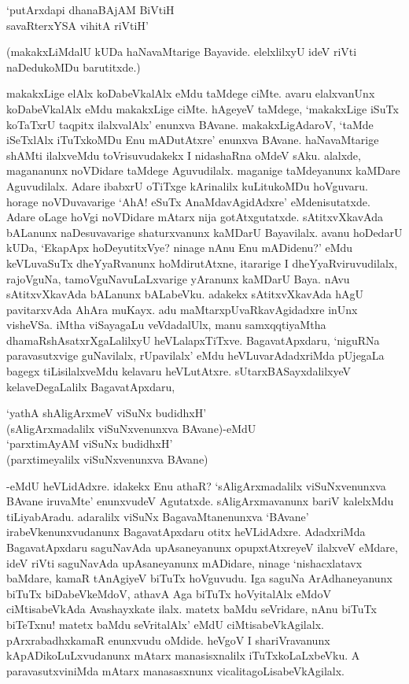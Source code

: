 \begin{shloka}
`putArxdapi dhanaBAjAM BiVtiH\\
savaRterxYSA vihitA riVtiH'
\end{shloka}

(makakxLiMdalU kUDa haNavaMtarige Bayavide. elelxlilxyU ideV riVti naDedukoMDu barutitxde.)

makakxLige elAlx koDabeVkalAlx eMdu taMdege ciMte. avaru elalxvanUnx koDabeVkalAlx eMdu makakxLige ciMte. hAgeyeV taMdege, `makakxLige iSuTx koTaTxrU taqpitx ilalxvalAlx' enunxva BAvane. makakxLigAdaroV, `taMde iSeTxlAlx iTuTxkoMDu Enu mADutAtxre' enunxva BAvane. haNavaMtarige shAMti ilalxveMdu toVrisuvudakekx I nidashaRna oMdeV sAku. alalxde, magananunx noVDidare taMdege Aguvudilalx. maganige taMdeyanunx kaMDare Aguvudilalx. Adare ibabxrU oTiTxge kArinalilx kuLitukoMDu hoVguvaru. horage noVDuvavarige `AhA! eSuTx AnaMdavAgidAdxre' eMdenisutatxde. Adare oLage hoVgi noVDidare mAtarx nija gotAtxgutatxde. sAtitxvXkavAda bALanunx naDesuvavarige shaturxvanunx kaMDarU Bayavilalx. avanu hoDedarU kUDa, `EkapApx hoDeyutitxVye? ninage nAnu Enu mADidenu?' eMdu keVLuvaSuTx dheYyaRvanunx hoMdirutAtxne, itararige I dheYyaRviruvudilalx, rajoVguNa, tamoVguNavuLaLxvarige yAranunx kaMDarU Baya. nAvu sAtitxvXkavAda bALanunx bALabeVku. adakekx sAtitxvXkavAda hAgU pavitarxvAda AhAra muKayx. adu maMtarxpUvaRkavAgidadxre inUnx visheVSa. iMtha viSayagaLu veVdadalUlx, manu samxqqtiyaMtha dhamaRshAsatxrXgaLalilxyU heVLalapxTiTxve. BagavatApxdaru, `niguRNa paravasutxvige guNavilalx, rUpavilalx' eMdu heVLuvarAdadxriMda pUjegaLa bagegx tiLisilalxveMdu kelavaru heVLutAtxre. sUtarxBASayxdalilxyeV kelaveDegaLalilx BagavatApxdaru,

\begin{shloka}
`yathA shAligArxmeV viSuNx budidhxH'\\
(sAligArxmadalilx viSuNxvenunxva BAvane)-eMdU\\
`parxtimAyAM viSuNx budidhxH'\\
(parxtimeyalilx viSuNxvenunxva BAvane)
\end{shloka}

-eMdU heVLidAdxre. idakekx Enu athaR? `sAligArxmadalilx viSuNxvenunxva BAvane iruvaMte' enunxvudeV Agutatxde. sAligArxmavanunx bariV kalelxMdu tiLiyabAradu. adaralilx viSuNx BagavaMtanenunxva `BAvane' irabeVkenunxvudanunx BagavatApxdaru otitx heVLidAdxre. AdadxriMda BagavatApxdaru saguNavAda upAsaneyanunx opupxtAtxreyeV ilalxveV eMdare, ideV riVti saguNavAda upAsaneyanunx mADidare, ninage `nishacxlatavx baMdare, kamaR tAnAgiyeV biTuTx hoVguvudu. Iga saguNa ArAdhaneyanunx biTuTx biDabeVkeMdoV, athavA Aga biTuTx hoVyitalAlx eMdoV ciMtisabeVkAda Avashayxkate ilalx. matetx baMdu seVridare, nAnu biTuTx biTeTxnu! matetx baMdu seVritalAlx' eMdU ciMtisabeVkAgilalx. pArxrabadhxkamaR enunxvudu oMdide. heVgoV I shariVravanunx kApADikoLuLxvudanunx mAtarx manasisxnalilx iTuTxkoLaLxbeVku. A paravasutxviniMda mAtarx manasasxnunx vicalitagoLisabeVkAgilalx.

